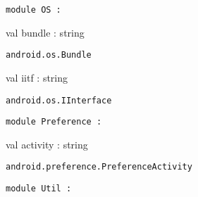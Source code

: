 \documentclass[11pt]{article}
\begin{document}
\begin{ocamldoccode}
{\tt{module }}{\tt{OS}}{\tt{ : }}\end{ocamldoccode}
\label{module:Android.OS}

\begin{ocamldocsigend}


\label{val:Android.OS.bundle}\begin{ocamldoccode}
val bundle : string
\end{ocamldoccode}
\begin{ocamldocdescription}
{\tt{android.os.Bundle}}


\end{ocamldocdescription}


\label{val:Android.OS.iitf}\begin{ocamldoccode}
val iitf : string
\end{ocamldoccode}
\begin{ocamldocdescription}
{\tt{android.os.IInterface}}


\end{ocamldocdescription}
\end{ocamldocsigend}






\begin{ocamldoccode}
{\tt{module }}{\tt{Preference}}{\tt{ : }}\end{ocamldoccode}
\label{module:Android.Preference}

\begin{ocamldocsigend}


\label{val:Android.Preference.activity}\begin{ocamldoccode}
val activity : string
\end{ocamldoccode}
\begin{ocamldocdescription}
{\tt{android.preference.PreferenceActivity}}


\end{ocamldocdescription}
\end{ocamldocsigend}






\begin{ocamldoccode}
{\tt{module }}{\tt{Util}}{\tt{ : }}\end{ocamldoccode}
\label{module:Android.Util}
\end{document}
